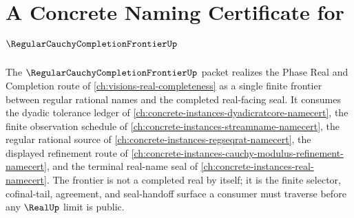 \chapter{A Concrete Naming Certificate for $\RegularCauchyCompletionFrontierUp$}
\label{ch:concrete-instances-regular-cauchy-completion-frontier-namecert}

The $\RegularCauchyCompletionFrontierUp$ packet realizes the Phase Real and Completion route of \autoref{ch:visions-real-completeness} as a single finite frontier between regular rational names and the completed real-facing seal. It consumes the dyadic tolerance ledger of \autoref{ch:concrete-instances-dyadicratcore-namecert}, the finite observation schedule of \autoref{ch:concrete-instances-streamname-namecert}, the regular rational source of \autoref{ch:concrete-instances-regseqrat-namecert}, the displayed refinement route of \autoref{ch:concrete-instances-cauchy-modulus-refinement-namecert}, and the terminal real-name seal of \autoref{ch:concrete-instances-real-namecert}. The frontier is not a completed real by itself; it is the finite selector, cofinal-tail, agreement, and seal-handoff surface a consumer must traverse before any $\RealUp$ limit is public.

